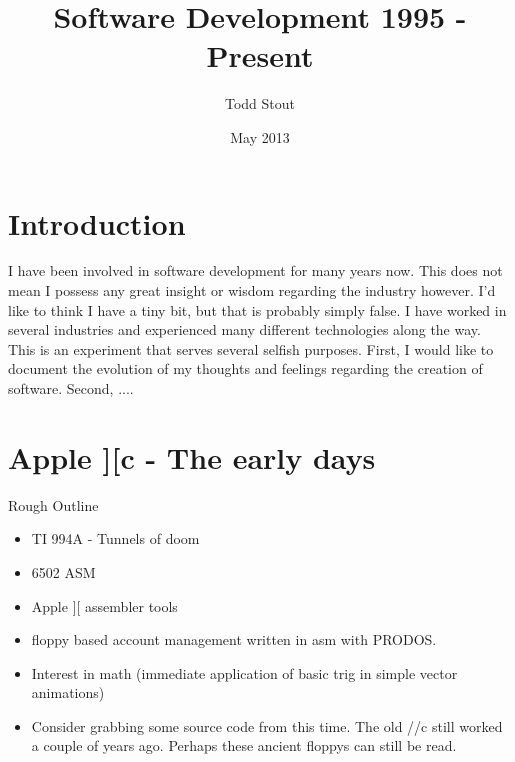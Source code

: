\documentclass[12pt]{article}
\title{Software Development 1995 - Present}
\author{Todd Stout}
\date{May 2013}
\begin{document}
\maketitle

\section{Introduction}

I have been involved in software development for many years now. This does not mean I possess any great insight or wisdom regarding the industry however. I'd like to think I have a tiny bit, but that is probably simply false. I have worked in several industries and experienced many different technologies along the way. This is an experiment that serves several selfish purposes. First, I would like to document the evolution of my thoughts and feelings regarding the creation of software. Second, .... 

\pagebreak

%
%
\section{Apple ][c - The early days}
	Rough Outline
	\begin{itemize}
	\item TI 994A - Tunnels of doom
	\item 6502 ASM
	\item Apple ][ assembler tools
	\item floppy based account management written in asm with PRODOS.
	\item Interest in math (immediate application of basic trig in simple vector animations)
	\item Consider grabbing some source code from this time. The old //c still worked a couple of years ago. Perhaps these ancient floppys can still be read.
	\end{itemize}
	
\end{document}
